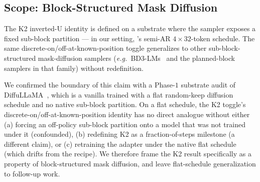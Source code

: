 \subsection{Scope: Block-Structured Mask Diffusion}
\label{subsec:k2_scope}

The K2 inverted-U identity is defined on a substrate where the
sampler exposes a fixed sub-block partition --- in our setting,
\LLaDA{}'s semi-AR $4{\times}32$-token schedule.  The same
discrete-on/off-at-known-position toggle generalizes to other
sub-block-structured mask-diffusion samplers (\textit{e.g.\
}BD3-LMs~\citep{arriola2025bd3lms} and the planned-block samplers
in that family) without redefinition.

We confirmed the boundary of this claim with a Phase-$1$
substrate audit of DiffuLLaMA~\citep{gong2024diffullama}, which is
a vanilla \code{LlamaForCausalLM} trained with a flat random-keep
diffusion schedule and no native sub-block partition.  On a flat
schedule, the K2 toggle's discrete-on/off-at-known-position
identity has no direct analogue without either (a) forcing an
off-policy sub-block partition onto a model that was not trained
under it (confounded), (b) redefining K2 as a fraction-of-steps
milestone (a different claim), or (c) retraining the adapter under
the native flat schedule (which drifts from the \LLaDA{} recipe).
We therefore frame the K2 result specifically as a property of
block-structured mask diffusion, and leave flat-schedule
generalization to follow-up work.
